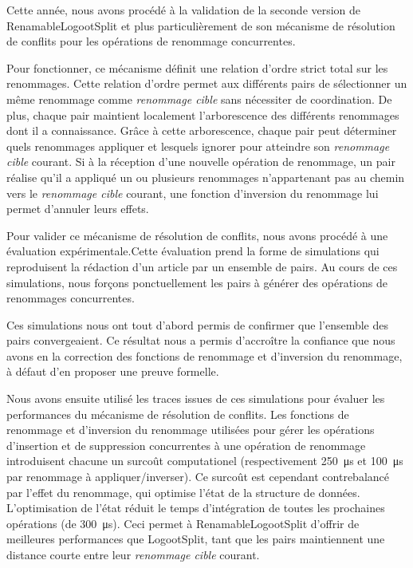 \documentclass[12pt]{article}
\newcommand{\umicrosecond}[1]{\SI{#1}{\micro\second}}
\begin{document}
Cette année, nous avons procédé à la validation de la seconde version de RenamableLogootSplit et plus particulièrement de son mécanisme de résolution de conflits pour les opérations de renommage concurrentes.

Pour fonctionner, ce mécanisme définit une relation d'ordre strict total sur les renommages.
Cette relation d'ordre permet aux différents pairs de sélectionner un même renommage comme \emph{renommage cible} sans nécessiter de coordination.
De plus, chaque pair maintient localement l'arborescence des différents renommages dont il a connaissance.
Grâce à cette arborescence, chaque pair peut déterminer quels renommages appliquer et lesquels ignorer pour atteindre son \emph{renommage cible} courant.
Si à la réception d'une nouvelle opération de renommage, un pair réalise qu'il a appliqué un ou plusieurs renommages n'appartenant pas au chemin vers le \emph{renommage cible} courant, une fonction d'inversion du renommage lui permet d'annuler leurs effets.

Pour valider ce mécanisme de résolution de conflits, nous avons procédé à une évaluation expérimentale.Cette évaluation prend la forme de simulations qui reproduisent la rédaction d'un article par un ensemble de pairs.
Au cours de ces simulations, nous forçons ponctuellement les pairs à générer des opérations de renommages concurrentes.

Ces simulations nous ont tout d'abord permis de confirmer que l'ensemble des pairs convergeaient.
Ce résultat nous a permis d'accroître la confiance que nous avons en la correction des fonctions de renommage et d'inversion du renommage, à défaut d'en proposer une preuve formelle.

Nous avons ensuite utilisé les traces issues de ces simulations pour évaluer les performances du mécanisme de résolution de conflits.
Les fonctions de renommage et d'inversion du renommage utilisées pour gérer les opérations d'insertion et de suppression concurrentes à une opération de renommage introduisent chacune un surcoût computationel (respectivement \umicrosecond{250} et \umicrosecond{100} par renommage à appliquer/inverser).
Ce surcoût est cependant contrebalancé par l'effet du renommage, qui optimise l'état de la structure de données.
L'optimisation de l'état réduit le temps d'intégration de toutes les prochaines opérations (de \umicrosecond{300}).
Ceci permet à RenamableLogootSplit d'offrir de meilleures performances que LogootSplit, tant que les pairs maintiennent une distance courte entre leur \emph{renommage cible} courant.
\end{document}
